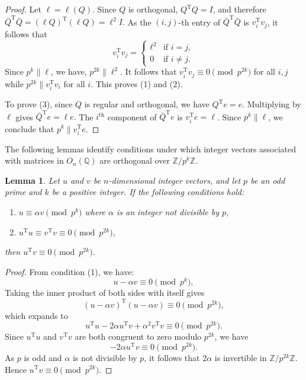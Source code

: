 \documentclass[12pt]{article}
\theoremstyle{plain}
\newtheorem{lemma}[theorem]{Lemma}
\theoremstyle{definition}
\newcommand{\trans}{^{\mathrm{T}}}
\begin{document}
\begin{proof}
Let $\ell = \ell(Q)$. Since $Q$ is orthogonal, $Q\trans Q = I$, and therefore $\bar{Q}\trans \bar{Q} = (\ell Q)\trans (\ell Q) = \ell^2 I.$ As the $(i,j)$-th entry of $\bar Q\trans \bar Q$ is $v_i\trans v_j$, it follows that
$$v_i\trans v_j = \begin{cases}
\ell^2 & \text{if } i = j, \\
0 & \text{if } i \neq j. \end{cases}
$$
Since $p^k \parallel \ell$, we have, $p^{2k} \parallel \ell^2$. It follows that $v_i\trans v_j\equiv0\pmod{p^{2k}}$ for all $i, j$ while $p^{2k} \parallel v_i\trans v_i$ for all $i$. This proves (1) and (2).

To prove (3), since $Q$ is regular and orthogonal, we have $Q\trans e=e$. Multiplying by $\ell$ gives $\bar{Q}\trans e = \ell e.$
The $i^\text{th}$ component of $\bar{Q}\trans e$ is $v_i\trans e = \ell$. Since $p^k \parallel \ell$, we conclude that $p^k \parallel v_i\trans e$.
\end{proof}

The following lemmas identify conditions under which integer vectors associated with matrices in $O_n(\mathbb{Q})$ are orthogonal over $\mathbb{Z}/p^k\mathbb{Z}$.

\begin{lemma}
\label{lemma:uv}
Let $u$ and $v$ be $n$-dimensional integer vectors, and let $p$ be an odd prime and $k$ be a positive integer. If the following conditions hold:
\begin{enumerate}
\item $u \equiv \alpha v \pmod{p^k}$ where $\alpha$ is an integer not divisible by $p$,
\item $u\trans u \equiv v\trans v \equiv 0 \pmod{p^{2k}}$,
\end{enumerate}
then $u\trans v \equiv 0 \pmod{p^{2k}}$.
\end{lemma}

\begin{proof}
From condition (1), we have:
$$u - \alpha v \equiv 0 \pmod{p^{k}},$$
Taking the inner product of both sides with itself gives
$$(u - \alpha v)\trans (u - \alpha v) \equiv 0 \pmod{p^{2k}},$$
which expands to
$$u\trans u - 2 \alpha u\trans v + \alpha^2 v\trans v \equiv 0 \pmod{p^{2k}}.$$
Since $u\trans u$ and $v\trans v$ are both congruent to zero modulo $p^{2k}$, we have
$$-2 \alpha u\trans v \equiv 0 \pmod{p^{2k}}.$$
As $p$ is odd and $\alpha$ is not divisible by $p$, it follows that $2 \alpha$ is invertible in $\mathbb{Z}/p^{2k}\mathbb{Z}$. Hence $u\trans v \equiv 0 \pmod{p^{2k}}.$
\end{proof}
\end{document}
